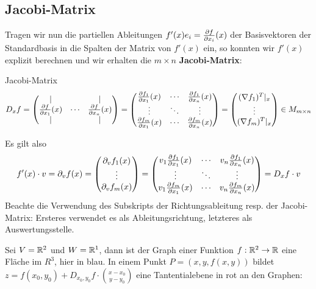 \subsection{Jacobi-Matrix}
Tragen wir nun die partiellen Ableitungen $f'(x)e_i = \diffp{f}{x_i}(x)$ der Basisvektoren der Standardbasis in die Spalten der Matrix von $f'(x)$ ein, so konnten wir $f'(x)$ explizit berechnen und wir erhalten die $m \times n$ \textbf{Jacobi-Matrix}: 

\begin{definition}{Jacobi-Matrix}{}
\begin{align*}
    D_xf = \mat{\vert& & \vert \\\diffp{f}{x_1}(x) & \cdots & \diffp{f}{x_n}(x) \\ \vert & & \vert } = \mat{\diffp{f_1}{x_1}(x) & \cdots & \diffp{f_1}{x_n}(x)\\
    \vdots & \ddots & \vdots \\
    \diffp{f_m}{x_1}(x) & \cdots & \diffp{f_m}{x_n}(x) } =
    \mat{(\nabla f_1)^T\vert_{x}  \\ \vdots  \\  (\nabla f_m)^T\vert_{x} } \in M_{m \times n}
\end{align*}
\end{definition}
Es gilt also
$$f'(x) \cdot v = \partial_v f(x) = \mat{\partial_vf_1(x)\\ \vdots \\ \partial_v f_m(x)} = \mat{v_1\diffp{f_1}{x_1}(x) & \cdots & v_n\diffp{f_1}{x_n}(x)\\
    \vdots & \ddots & \vdots \\
    v_1\diffp{f_m}{x_1}(x) & \cdots & v_n\diffp{f_m}{x_n}(x) } = D_xf \cdot v$$
Beachte die Verwendung des Subskripts der Richtungsableitung resp. der Jacobi-Matrix: Ersteres verwendet es als Ableitungsrichtung, letzteres als Auswertungsstelle.

\begin{example}
Sei $V = \mathbb{R}^2$ und $W= \mathbb{R}^1$, dann ist der Graph einer Funktion $f: \mathbb{R}^2 \to \mathbb{R}$ eine Fläche im $R^3$, hier in blau. In einem Punkt $P = (x,y, f(x,y))$ bildet $z = f(x_0, y_0) + D_{x_0, y_0}f\cdot \binom{x-x_0}{y-y_0}$ eine Tantentialebene in rot an den Graphen:
\begin{center}
    \centering
\end{center}
\end{example}


